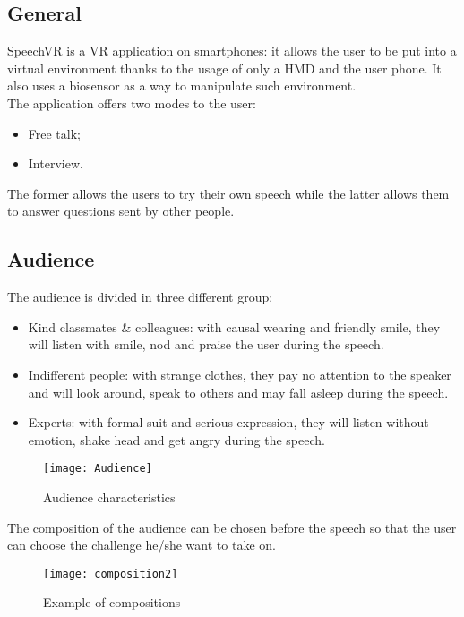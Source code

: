 \subsection{General}
SpeechVR is a VR application on smartphones: it allows the user to be put into a virtual environment thanks to the usage of only a HMD and the user phone. It also uses a biosensor as a way to manipulate such environment.\\
The application offers two modes to the user:
\begin{itemize}
	\item Free talk;
	\item Interview.
\end{itemize}
The former allows the users to try their own speech while the latter allows them to answer questions sent by other people.

\subsection{Audience}
The audience is divided in three different group: 
\begin{itemize}
	\item Kind classmates \& colleagues: with causal wearing and friendly smile, they will listen with smile, nod and praise the user during the speech.
	\item Indifferent people: with strange clothes, they pay no attention to the speaker and will look around, speak to others and may fall asleep during the speech.
	\item Experts: with formal suit and serious expression, they will listen without emotion, shake head and get angry during the speech.
\end{itemize}

\begin{figure}[H]
	\centering
	\texttt{[image: Audience]}
	\caption{Audience characteristics}
\end{figure}

The composition of the audience can be chosen before the speech so that the user can choose the challenge he/she want to take on.

\begin{figure}[H]
	\centering
	\texttt{[image: composition2]}
	\caption{Example of compositions}
\end{figure}
